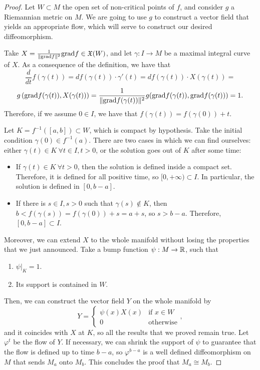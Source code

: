 \begin{proof}
Let $W \subset M$ the open set of non-critical points of $f$, and consider $g$ a Riemannian metric on $M$. We are going to use $g$ to construct a vector field that yields an appropriate flow, which will serve to construct our desired diffeomorphism.

Take $X = \frac1{\|\mathrm{grad} f\|^2}\mathrm{grad} f \in \mathfrak{X}(W)$, and let $\gamma : I \rightarrow M$ be a maximal integral curve of $X$. As a consequence of the definition, we have that
\[\frac{d}{d t} f(\gamma(t)) = d f(\gamma(t)) \cdot \gamma'(t) = d f(\gamma(t)) \cdot X(\gamma(t)) =\]
\[g\left(\mathrm{grad} f(\gamma(t)),X(\gamma(t))\right) = \frac1{\|\mathrm{grad} f(\gamma(t))\|^2} g(\mathrm{grad} f(\gamma(t)),\mathrm{grad} f(\gamma(t))) = 1 .\]
Therefore, if we assume $0 \in I$, we have that $f(\gamma(t)) = f(\gamma(0)) + t$.

Let $K = f^{-1}([a,b]) \subset W$, which is compact by hypothesis. Take the initial condition $\gamma(0) \in f^{-1}(a)$. There are two cases in which we can find ourselves: either $\gamma(t) \in K \ \forall t \in I, t > 0$, or the solution goes out of $K$ after some time:
\begin{itemize}
	\item If $\gamma(t) \in K \ \forall t > 0$, then the solution is defined inside a compact set. Therefore, it is defined for all positive time, so $[0,+\infty) \subset I$. In particular, the solution is defined in $[0,b-a]$.
	\item If there is $s \in I, s > 0$ such that $\gamma(s) \notin K$, then $b < f(\gamma(s)) = f(\gamma(0)) + s = a+s$, so $s > b-a$. Therefore, $[0,b-a] \subset I$.
\end{itemize}

Moreover, we can extend $X$ to the whole manifold without losing the properties that we just announced. Take a bump function $\psi : M \rightarrow \mathbb{R}$, such that
\begin{enumerate}
	\item $\left. \psi \right|_K = 1$.
	\item Its support is contained in $W$.
\end{enumerate}

Then, we can construct the vector field $Y$ on the whole manifold by
\[Y = \left\{ \begin{array}{ll} \psi(x) X(x) & \text{if } x \in W \\ 0 & \text{otherwise} \end{array} \right. ,\]
and it coincides with $X$ at $K$, so all the results that we proved remain true. Let $\varphi^t$ be the flow of $Y$. If necessary, we can shrink the support of $\psi$ to guarantee that the flow is defined up to time $b-a$, so $\varphi^{b-a}$ is a well defined diffeomorphism on $M$ that sends $M_a$ onto $M_b$. This concludes the proof that $M_a \cong M_b$.


\end{proof}
